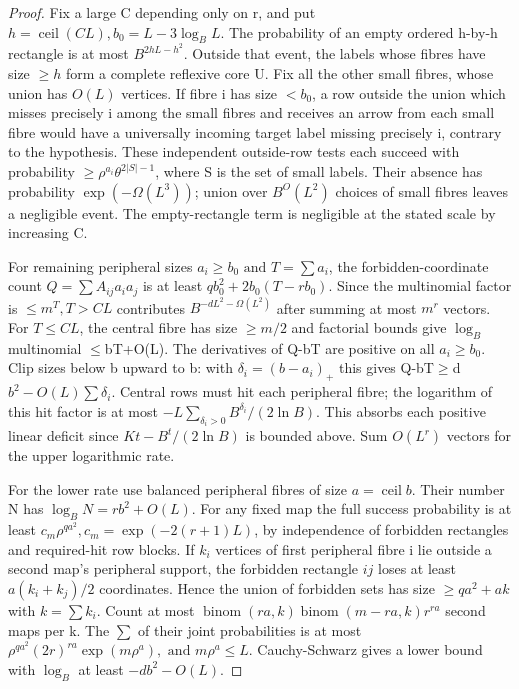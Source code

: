 \documentclass[11pt]{article}
\begin{document}
\begin{proof} Fix a large C depending only on r, and put $h=\operatorname{ceil}(C L), b_{0}=L-3 \log _{B} L$. The probability of an empty ordered h-by-h rectangle is at most $B^{2hL-h^{2}}$. Outside that event, the labels whose fibres have size $\geq h$ form a complete reflexive core U. Fix all the other small fibres, whose union has $O(L)$ vertices. If fibre i has size $<b_{0}$, a row outside the union which misses precisely i among the small fibres and receives an arrow from each small fibre would have a universally incoming target label missing precisely i, contrary to the hypothesis. These independent outside-row tests each succeed with probability $\geq \rho ^{a_{i}} \theta ^{2|S|-1}$, where S is the set of small labels. Their absence has probability $\exp (-\Omega (L^{3}))$; union over $B^{O}(L^{2})$ choices of small fibres leaves a negligible event. The empty-rectangle term is negligible at the stated scale by increasing C.

For remaining peripheral sizes $a_{i}\geq b_{0} \text{ and } T=\sum  a_{i}$, the forbidden-coordinate count $Q=\sum  A_{ij} a_{i} a_{j}$ is at least $q b_{0}^{2}+2b_{0}(T-r b_{0})$. Since the multinomial factor is $\leq m^{T}, T>CL$ contributes $B^{-d L^{2}-\Omega (L^{2})}$ after summing at most $m^{r}$ vectors. For $T\leq CL$, the central fibre has size $\geq m/2$ and factorial bounds give $\log _{B}$ multinomial \ensuremath{\leq}bT+O(L). The derivatives of Q-bT are positive on all $a_{i}\geq b_{0}$. Clip sizes below b upward to b: with $\delta _{i}=(b-a_{i})_{+}$ this gives Q-bT\ensuremath{\geq}d $b^{2}-O(L)\sum  \delta _{i}$. Central rows must hit each peripheral fibre; the logarithm of this hit factor is at most $-L \sum _{\delta _{i}>0} B^{\delta _{i}}/(2 \ln  B)$. This absorbs each positive linear deficit since $K t-B^{t}/(2 \ln  B)$ is bounded above. Sum $O(L^{r})$ vectors for the upper logarithmic rate.

For the lower rate use balanced peripheral fibres of size $a=\operatorname{ceil} b$. Their number N has $\log _{B} N=r b^{2}+O(L)$. For any fixed map the full success probability is at least $c_{m} \rho ^{q a^{2}}, c_{m}=\exp (-2(r+1)L)$, by independence of forbidden rectangles and required-hit row blocks. If $k_{i}$ vertices of first peripheral fibre i lie outside a second map's peripheral support, the forbidden rectangle $ij$ loses at least $a(k_{i}+k_{j})/2$ coordinates. Hence the union of forbidden sets has size $\geq q a^{2}+a k$ with $k=\sum  k_{i}$. Count at most $\operatorname{binom}(ra,k)\operatorname{binom}(m-ra,k)r^{ra}$ second maps per k. The $\sum $ of their joint probabilities is at most $\rho ^{q a^{2}}(2r)^{ra} \exp (m \rho ^{a}), \text{ and } m \rho ^{a}\leq L$. Cauchy-Schwarz gives a lower bound with $\log _{B}$ at least $-d b^{2}-O(L)$.


\end{proof}
\end{document}
